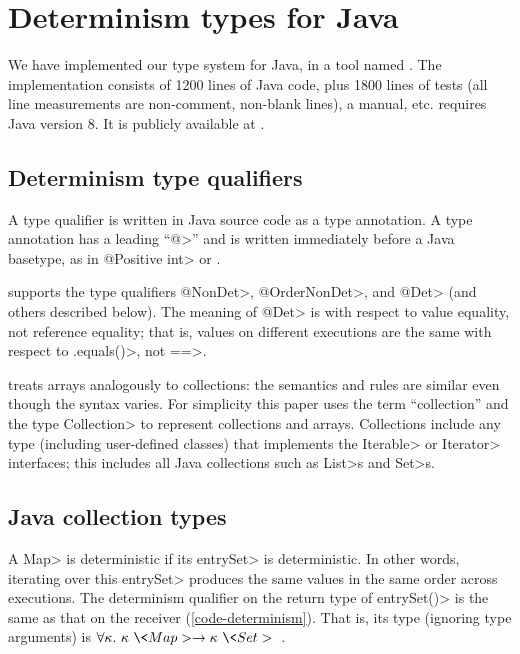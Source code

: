 \section{Determinism types for Java}\label{sec:java-types}

We have implemented our type system for Java, in a tool named \theDeterminismChecker.
The implementation consists of 1200 lines of Java
code, plus 1800 lines of tests (all line measurements are non-comment,
non-blank lines), a manual, etc.
\TheDeterminismChecker requires Java version 8.
It is publicly available at
.


\subsection{Determinism type qualifiers}

A type qualifier is written in Java source code as a type annotation.
A type annotation has a leading ``\<@>'' and is written immediately before a
Java basetype, as in \<@Positive int> or .

\TheDeterminismChecker supports the type qualifiers \<@NonDet>,
\<@OrderNonDet>, and \<@Det> (and others described below).
The meaning of \<@Det> is with respect to value
equality, not reference equality; that is,
values on different executions are the same with respect to \<.equals()>,
not \<==>.

\TheDeterminismChecker treats arrays analogously to collections:
the semantics and rules are similar even though the syntax varies.
For simplicity this
paper uses the term ``collection'' and the type \<Collection> to represent
collections and arrays.
Collections include any type (including user-defined classes) that
implements the \<Iterable> or \<Iterator> interfaces; this includes all
Java collections such as \<List>s and \<Set>s.



\subsection{Java collection types}\label{sec:maps-java}

A \<Map> is deterministic if its \<entrySet> is deterministic.
In other words, iterating over this \<entrySet> produces the same values in the same order across executions.
The determinism qualifier on the return type of \<entrySet()> is the
same as that on the receiver (\cref{code-determinism}).
That is, its type (ignoring type arguments) is
$\forallt{\kappa} \kappa\ \<Map> \rightarrow \kappa\ \<Set>$\ .

